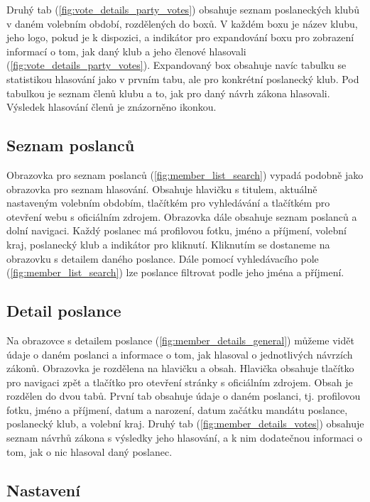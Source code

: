 Druhý tab (\ref{fig:vote_details_party_votes}) obsahuje seznam poslaneckých klubů v daném volebním období, rozdělených do boxů. V každém boxu je název klubu, jeho logo, pokud je k dispozici, a indikátor pro expandování boxu pro zobrazení informací o tom, jak daný klub a jeho členové hlasovali (\ref{fig:vote_details_party_votes}). Expandovaný box obsahuje navíc tabulku se statistikou hlasování jako v prvním tabu, ale pro konkrétní poslanecký klub. Pod tabulkou je seznam členů klubu a to, jak pro daný návrh zákona hlasovali. Výsledek hlasování členů je znázorněno ikonkou.

\subsection*{Seznam poslanců}
\label{ssec:design-members}

Obrazovka pro seznam poslanců (\ref{fig:member_list_search}) vypadá podobně jako obrazovka pro seznam hlasování. Obsahuje hlavičku s titulem, aktuálně nastaveným volebním obdobím, tlačítkém pro vyhledávání a tlačítkém pro otevření webu s oficiálním zdrojem. Obrazovka dále obsahuje seznam poslanců a dolní navigaci. Každý poslanec má profilovou fotku, jméno a příjmení, volební kraj, poslanecký klub a indikátor pro kliknutí. Kliknutím se dostaneme na obrazovku s detailem daného poslance. Dále pomocí vyhledávacího pole (\ref{fig:member_list_search}) lze poslance filtrovat podle jeho jména a příjmení.

\subsection*{Detail poslance}
\label{ssec:design-member}

Na obrazovce s detailem poslance (\ref{fig:member_details_general}) můžeme vidět údaje o daném poslanci a informace o tom, jak hlasoval o jednotlivých návrzích zákonů. Obrazovka je rozdělena na hlavičku a obsah. Hlavička obsahuje tlačítko pro navigaci zpět a tlačítko pro otevření stránky s oficiálním zdrojem. Obsah je rozdělen do dvou tabů. První tab obsahuje údaje o daném poslanci, tj. profilovou fotku, jméno a příjmení, datum a narození, datum začátku mandátu poslance, poslanecký klub, a volební kraj. Druhý tab (\ref{fig:member_details_votes}) obsahuje seznam návrhů zákona s výsledky jeho hlasování, a k nim dodatečnou informaci o tom, jak o nic hlasoval daný poslanec. 

\subsection*{Nastavení}
\label{ssec:design-settings}
	

